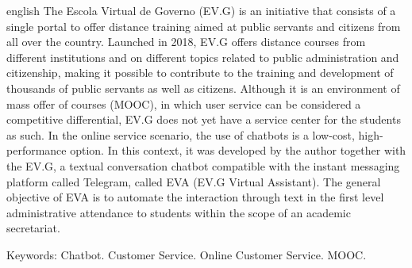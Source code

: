 %
%
%
%

\begin{resumo}[Abstract]
 \begin{otherlanguage*}{english}
The Escola Virtual de Governo (EV.G) is an initiative that consists of a single portal to offer distance training aimed at public servants and citizens from all over the country.
Launched in 2018, EV.G offers distance courses from different institutions and on different topics related to public administration and citizenship, making it possible to contribute to the training and development of thousands of public servants as well as citizens.
Although it is an environment of mass offer of courses (MOOC), in which user service can be considered a competitive differential, EV.G does not yet have a service center for the students as such.
In the online service scenario, the use of chatbots is a low-cost, high-performance option.
In this context, it was developed by the author together with the EV.G, a textual conversation chatbot compatible with the instant messaging platform called Telegram, called EVA (EV.G Virtual Assistant). The general objective of EVA is to automate the interaction through text in the first level administrative attendance to students within the scope of an academic secretariat.


   \noindent
   {Keywords}: Chatbot. Customer Service. Online Customer Service. MOOC.
 \end{otherlanguage*}
\end{resumo}

